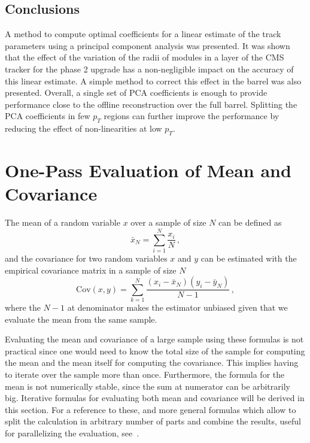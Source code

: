 \documentclass[10pt,a4paper]{report}
\begin{document}
\subsection{Conclusions}

A method to compute optimal coefficients for a linear estimate of the track parameters using a principal component analysis was presented. It was shown that the effect of the variation of the radii of modules in a layer of the CMS tracker for the phase 2 upgrade has a non-negligible impact on the accuracy of this linear estimate. A simple method to correct this effect in the barrel was also presented. Overall, a single set of PCA coefficients is enough to provide performance close to the offline reconstruction over the full barrel. Splitting the PCA coefficients in few $p_T$ regions can further improve the performance by reducing the effect of non-linearities at low $p_T$.

\newpage
\appendix
\section{One-Pass Evaluation of Mean and Covariance}

The mean of a random variable $x$ over a sample of size $N$ can be defined as
\begin{equation}
\bar{x}_N = \sum\limits_{i=1}^N\frac{x_i}{N}\, ,
\label{eq:mean}
\end{equation}
and the covariance for two random variables $x$ and $y$ can be estimated with the empirical covariance matrix in a sample of size $N$
\begin{equation}
\mbox{Cov}(x,y) = \sum\limits_{k=1}^N \frac{(x_i - \bar{x}_N)(y_i - \bar{y}_N)}{N-1}\, ,
\label{eq:covariance}
\end{equation}
where the $N-1$ at denominator makes the estimator unbiased given that we evaluate the mean from the same sample.

Evaluating the mean and covariance of a large sample using these formulas is not practical since one would need to know the total size of the sample for computing the mean and the mean itself for computing the covariance. This implies having to iterate over the sample more than once. Furthermore, the formula for the mean is not numerically stable, since the sum at numerator can be arbitrarily big. Iterative formulas for evaluating both mean and covariance will be derived in this section. For a reference to these, and more general formulas which allow to split the calculation in arbitrary number of parts and combine the results, useful for parallelizing the evaluation, see~\cite{IterativeMeanAndCovariance}.
\end{document}
